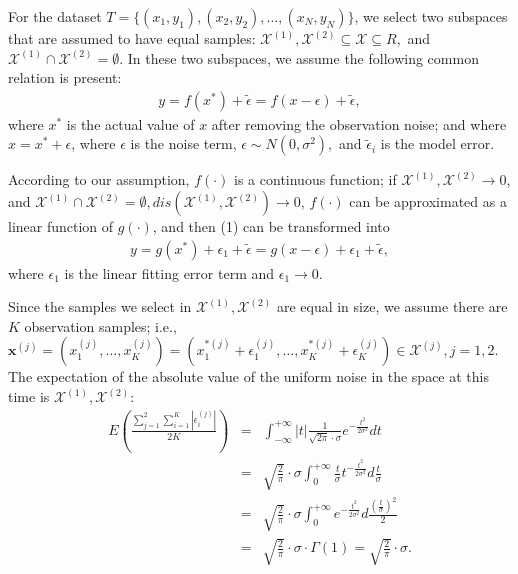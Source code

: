 \documentclass[mathematics,article,accept,pdftex,moreauthors]{Definitions/mdpi}
\begin{document}
For the dataset $T = \{(x_{1}, y_{1}), (x_{2}, y_{2}),\ldots, (x_{N}, y_{N})\}$, we select two subspaces that are assumed to have equal samples: $\mathcal{X}^{(1)}, \mathcal{X}^{(2)} \subseteq \mathcal{X} \subseteq R, $ and $\mathcal{X}^{(1)}\cap\mathcal{X}^{(2)} = \emptyset $. In these two subspaces, we assume the following common relation is present:
\begin{eqnarray}\label{e1}
	y = f(x^{*}) + \tilde{\epsilon} = f(x-\epsilon) + \tilde{\epsilon},
\end{eqnarray}
where $x^{*}$ is the actual value of $x$  after removing the observation noise; and where  $x = x^{*} + \epsilon$, where $\epsilon$ is the noise term, $\epsilon \sim N(0, \sigma^{2}), $  and $\tilde{\epsilon}_{i}$ is the model error.

According to our assumption,  $f(\cdot)$ is a continuous function; if $\mathcal{X}^{(1)}, \mathcal{X}^{(2)} \to 0$, and $\mathcal{X}^{(1)}\cap \mathcal{X}^{(2)} = \emptyset,
dis(\mathcal{X}^{(1)}, \mathcal{X}^{(2)}) \to 0 $, $f(\cdot)$ can be approximated as a linear function of $g(\cdot)$, and then (1) can be transformed into
\begin{eqnarray}\label{e2}
	y = g(x^{*}) + \epsilon_{1} + \tilde{\epsilon} = g(x-\epsilon) + \epsilon_{1} + \tilde{\epsilon},
\end{eqnarray}
where $\epsilon_{1}$ is the linear fitting error term and $\epsilon_{1} \to 0.$

Since the samples we select in $\mathcal{X}^{(1)}, \mathcal{X}^{(2)}$ are equal in size, we assume there are $K$ observation samples; i.e., $\bm{x}^{(j)} = (x_{1}^{(j)}, \ldots, x_{K}^{(j)}) = (x_{1}^{*(j)} + \epsilon_{1}^{(j)}, \ldots, x_{K}^{*(j)} + \epsilon_{K}^{(j)}) \in \mathcal{X}^{(j)}, j=1, 2.$ The expectation of the absolute value of the uniform noise in the space at this time is $\mathcal{X}^{(1)}, \mathcal{X}^{(2)} $:
\vspace{-9pt}
\begin{eqnarray*}
	E(\frac{\sum_{j=1}^{2}\sum_{i=1}^{K}|\epsilon_{i}^{(j)}|}{2K})
	&=& \int_{-\infty}^{+\infty}|t|\frac{1}{\sqrt{2\pi} \cdot \sigma} e^{-\frac{t^{2}}{2\sigma^{2}}} dt \\
	&=&
	\sqrt{\frac{2}{\pi}} \cdot \sigma \int_{0}^{+\infty} \frac{t}{\sigma} t^{-\frac{t^{2}}{2\sigma^{2}}}d\frac{t}{\sigma} \\
	&=&
	\sqrt{\frac{2}{\pi}} \cdot \sigma \int_{0}^{+\infty}  e^{-\frac{t^{2}}{2\sigma^{2}}}d\frac{(\frac{t}{\sigma})^{2}}{2} \\
	&=&
		\sqrt{\frac{2}{\pi}} \cdot \sigma \cdot \Gamma(1) = \sqrt{\frac{2}{\pi}} \cdot \sigma.
\end{eqnarray*}
\end{document}
